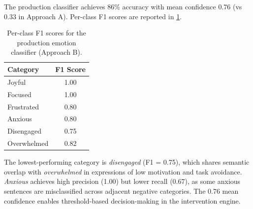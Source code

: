 The production classifier achieves 86\% accuracy with mean confidence 0.76 (vs 0.33 in Approach A). Per-class F1 scores are reported in \cref{tab:per-class-f1-impl}.

\begin{table}[htbp]
  \centering
  \caption{Per-class F1 scores for the production emotion classifier (Approach B).}
  \label{tab:per-class-f1-impl}
  \begin{tabular}{@{}lc@{}}
    \toprule
    \textbf{Category} & \textbf{F1 Score} \\
    \midrule
    Joyful       & 1.00 \\
    Focused      & 1.00 \\
    Frustrated   & 0.80 \\
    Anxious      & 0.80 \\
    Disengaged   & 0.75 \\
    Overwhelmed  & 0.82 \\
    \bottomrule
  \end{tabular}
\end{table}

The lowest-performing category is \emph{disengaged} (F1 = 0.75), which shares semantic overlap with \emph{overwhelmed} in expressions of low motivation and task avoidance. \emph{Anxious} achieves high precision (1.00) but lower recall (0.67), as some anxious sentences are misclassified across adjacent negative categories. The 0.76 mean confidence enables threshold-based decision-making in the intervention engine.



